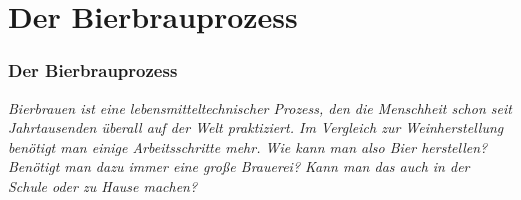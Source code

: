 \documentclass{scrartcl}  %
\begin{document}
			
\newpage
	\part{Der Bierbrauprozess}
	
	\section{Der Bierbrauprozess}

		\textit{Bierbrauen ist eine lebensmitteltechnischer Prozess, den die Menschheit schon seit Jahrtausenden überall auf der Welt praktiziert. Im Vergleich zur Weinherstellung benötigt man einige Arbeitsschritte mehr. Wie kann man also Bier herstellen? Benötigt man dazu immer eine große Brauerei? Kann man das auch in der Schule oder zu Hause machen?} \newline
		
\end{document}
